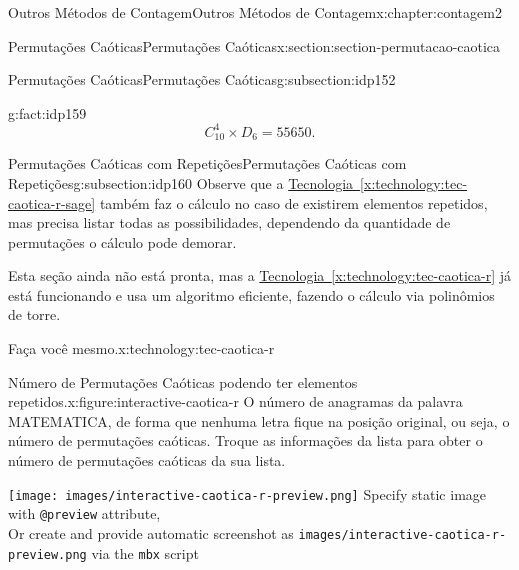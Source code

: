 \documentclass[oneside,10pt,]{book}
\newcommand{\xreffont}{\relax}
\newcommand{\mono}[1]{\texttt{#1}}
\numberwithin{equation}{section}
\newlength{\qrsize}
\newlength{\previewwidth}
\begin{document}
\begin{chapterptx}{Outros Métodos de Contagem}{}{Outros Métodos de Contagem}{}{}{x:chapter:contagem2}
\begin{sectionptx}{Permutações Caóticas}{}{Permutações Caóticas}{}{}{x:section:section-permutacao-caotica}
\begin{subsectionptx}{Permutações Caóticas}{}{Permutações Caóticas}{}{}{g:subsection:idp152}
\begin{fact}{}{}{g:fact:idp159}
\begin{equation*}
C_{10}^4\times D_6 = 55650.
\end{equation*}
%
\end{fact}
\end{subsectionptx}
%
%
\typeout{************************************************}
\typeout{************************************************}
%
\begin{subsectionptx}{Permutações Caóticas com Repetições}{}{Permutações Caóticas com Repetições}{}{}{g:subsection:idp160}
Observe que a \hyperref[x:technology:tec-caotica-r-sage]{Tecnologia~{\xreffont\ref{x:technology:tec-caotica-r-sage}}} também faz o cálculo no caso de existirem elementos  repetidos, mas precisa listar todas as possibilidades, dependendo da quantidade de permutações o cálculo pode demorar.%
\par
Esta seção ainda não está pronta, mas a \hyperref[x:technology:tec-caotica-r]{Tecnologia~{\xreffont\ref{x:technology:tec-caotica-r}}} já está funcionando e usa um algoritmo eficiente, fazendo o cálculo via polinômios de torre.%
\begin{technology}{Faça você mesmo.}{x:technology:tec-caotica-r}%
\begin{figureptx}{Número de Permutações Caóticas podendo ter elementos repetidos.}{x:figure:interactive-caotica-r}{}%
\centering
O número de anagramas da palavra MATEMATICA, de forma que nenhuma letra fique na posição original, ou seja, o número de permutações caóticas. Troque as informações da lista para obter o número de permutações caóticas da sua lista.%
\setlength{\qrsize}{9em}
\setlength{\previewwidth}{\linewidth}
\addtolength{\previewwidth}{-\qrsize}
\begin{tcbraster}[raster columns=2, raster column skip=1pt, raster halign=center, raster force size=false, raster left skip=0pt, raster right skip=0pt]%
\begin{tcolorbox}[previewstyle, width=\previewwidth]%
%
{\texttt{[image: images/interactive-caotica-r-preview.png]}}%
{\small{}Specify static image with \mono{@preview} attribute,\\Or create and provide automatic screenshot as \mono{images/interactive-caotica-r-preview.png} via the \mono{mbx} script}%
\end{tcolorbox}%
\begin{tcolorbox}[qrstyle]%
{\hypersetup{urlcolor=black}}%

\end{tcolorbox}
\end{tcbraster}
\end{figureptx}
\end{technology}
\end{subsectionptx}
\end{sectionptx}
\end{chapterptx}
\end{document}
